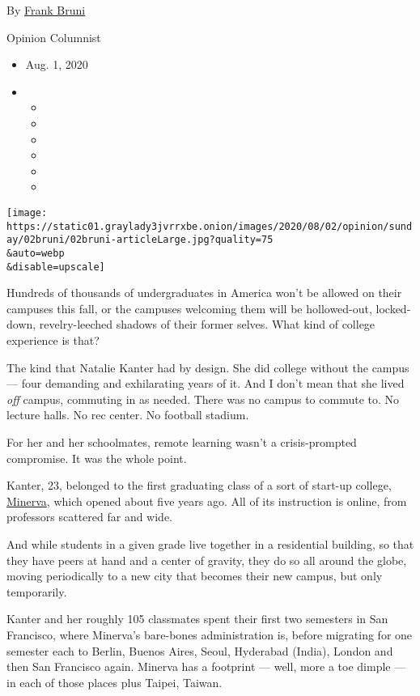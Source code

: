 By \href{https://www.nytimes3xbfgragh.onion/by/frank-bruni}{Frank Bruni}

Opinion Columnist

\begin{itemize}
\item
  Aug. 1, 2020
\item
  \begin{itemize}
  \item
  \item
  \item
  \item
  \item
  \item
  \end{itemize}
\end{itemize}

\texttt{[image: https://static01.graylady3jvrrxbe.onion/images/2020/08/02/opinion/sunday/02bruni/02bruni-articleLarge.jpg?quality=75\\\&auto=webp\\\&disable=upscale]}

Hundreds of thousands of undergraduates in America won't be allowed on
their campuses this fall, or the campuses welcoming them will be
hollowed-out, locked-down, revelry-leeched shadows of their former
selves. What kind of college experience is that?

The kind that Natalie Kanter had by design. She did college without the
campus --- four demanding and exhilarating years of it. And I don't mean
that she lived \emph{off} campus, commuting in as needed. There was no
campus to commute to. No lecture halls. No rec center. No football
stadium.

For her and her schoolmates, remote learning wasn't a crisis-prompted
compromise. It was the whole point.

Kanter, 23, belonged to the first graduating class of a sort of start-up
college,
\href{https://www.minervaproject.com/solutions/educational-solutions/}{Minerva},
which opened about five years ago. All of its instruction is online,
from professors scattered far and wide.

And while students in a given grade live together in a residential
building, so that they have peers at hand and a center of gravity, they
do so all around the globe, moving periodically to a new city that
becomes their new campus, but only temporarily.

Kanter and her roughly 105 classmates spent their first two semesters in
San Francisco, where Minerva's bare-bones administration is, before
migrating for one semester each to Berlin, Buenos Aires, Seoul,
Hyderabad (India), London and then San Francisco again. Minerva has a
footprint --- well, more a toe dimple --- in each of those places plus
Taipei, Taiwan.

